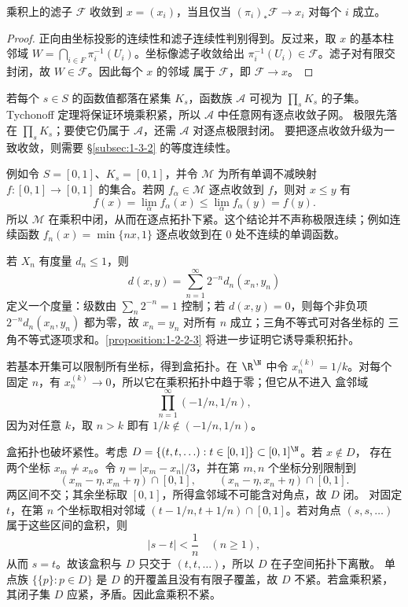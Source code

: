 \begin{proposition}[滤子的逐坐标收敛判别]\label{proposition:1-2-2-filter-coordinate}
乘积上的滤子 \(\mathcal F\) 收敛到 \(x=(x_i)\)，当且仅当
\((\pi_i)_*\mathcal F\to x_i\) 对每个 \(i\) 成立。
\end{proposition}
\begin{proof}
正向由坐标投影的连续性和滤子连续性判别得到。反过来，取 \(x\) 的基本柱邻域
\(W=\bigcap_{i\in F}\pi_i^{-1}(U_i)\)。坐标像滤子收敛给出
\(\pi_i^{-1}(U_i)\in\mathcal F\)。滤子对有限交封闭，故 \(W\in\mathcal F\)。因此每个 \(x\) 的邻域
属于 \(\mathcal F\)，即 \(\mathcal F\to x\)。
\end{proof}

\begin{example}[函数族的点态极限]\label{ex:1-2-2-1}
若每个 \(s\in S\) 的函数值都落在紧集 \(K_s\)，函数族 \(\mathcal A\) 可视为
\(\prod_sK_s\) 的子集。Tychonoff 定理将保证环境乘积紧，所以 \(\mathcal A\) 中任意网有逐点收敛子网。
极限先落在 \(\prod_sK_s\)；要使它仍属于 \(\mathcal A\)，还需 \(\mathcal A\) 对逐点极限封闭。
要把逐点收敛升级为一致收敛，则需要 \S\ref{subsec:1-3-2} 的等度连续性。

例如令 \(S=[0,1]\)、\(K_s=[0,1]\)，并令 \(\mathcal M\) 为所有单调不减映射
\(f:[0,1]\to[0,1]\) 的集合。若网 \(f_\alpha\in\mathcal M\) 逐点收敛到 \(f\)，则对
\(x\le y\) 有
\[
  f(x)=\lim_\alpha f_\alpha(x)\le \lim_\alpha f_\alpha(y)=f(y).
\]
所以 \(\mathcal M\) 在乘积中闭，从而在逐点拓扑下紧。这个结论并不声称极限连续；例如连续函数
\(f_n(x)=\min\{nx,1\}\) 逐点收敛到在 \(0\) 处不连续的单调函数。
\end{example}

\begin{example}[可数乘积度量的构造]\label{ex:1-2-2-2}
若 \(X_n\) 有度量 \(d_n\le1\)，则
\[
 d(x,y)=\sum_{n=1}^{\infty}2^{-n}d_n(x_n,y_n)
\]
定义一个度量：级数由 \(\sum_n2^{-n}=1\) 控制；若 \(d(x,y)=0\)，则每个非负项
\(2^{-n}d_n(x_n,y_n)\) 都为零，故 \(x_n=y_n\) 对所有 \(n\) 成立；三角不等式可对各坐标的
三角不等式逐项求和。\cref{proposition:1-2-2-3} 将进一步证明它诱导乘积拓扑。
\end{example}

\begin{example}[盒拓扑的双重失败]\label{ex:1-2-2-3}
若基本开集可以限制所有坐标，得到盒拓扑。在 \(\R^\N\) 中令
\(x^{(k)}_n=1/k\)。对每个固定 \(n\)，有 \(x^{(k)}_n\to0\)，所以它在乘积拓扑中趋于零；但它从不进入
盒邻域
\[
 \prod_{n=1}^{\infty}(-1/n,1/n),
\]
因为对任意 \(k\)，取 \(n>k\) 即有 \(1/k\notin(-1/n,1/n)\)。

盒拓扑也破坏紧性。考虑 \(D=\{(t,t,\ldots):t\in[0,1]\}\subset[0,1]^\N\)。若 \(x\notin D\)，
存在两个坐标 \(x_m\ne x_n\)。令 \(\eta=|x_m-x_n|/3\)，并在第 \(m,n\) 个坐标分别限制到
\[
  (x_m-\eta,x_m+\eta)\cap[0,1],\qquad
  (x_n-\eta,x_n+\eta)\cap[0,1].
\]
两区间不交；其余坐标取 \([0,1]\)，所得盒邻域不可能含对角点，故 \(D\) 闭。
对固定 \(t\)，在第 \(n\) 个坐标取相对邻域
\((t-1/n,t+1/n)\cap[0,1]\)。若对角点 \((s,s,\ldots)\) 属于这些区间的盒积，则
\[
  |s-t|<\frac1n\quad(n\ge1),
\]
从而 \(s=t\)。故该盒积与 \(D\) 只交于 \((t,t,\ldots)\)，所以 \(D\) 在子空间拓扑下离散。
单点族 \(\{\{p\}:p\in D\}\) 是 \(D\) 的开覆盖且没有有限子覆盖，故 \(D\) 不紧。若盒乘积紧，
其闭子集 \(D\) 应紧，矛盾。因此盒乘积不紧。
\end{example}

